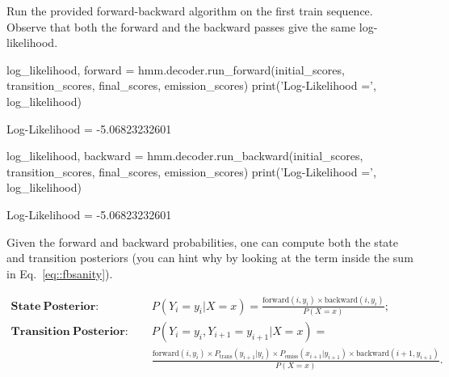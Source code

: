 \begin{exercise}
%
%

Run the provided forward-backward algorithm on the first train sequence. 
Observe that both the forward and the backward 
passes give the same log-likelihood.
\begin{python}
log_likelihood, forward = hmm.decoder.run_forward(initial_scores, transition_scores, final_scores, emission_scores)
print('Log-Likelihood =', log_likelihood)

Log-Likelihood = -5.06823232601

log_likelihood, backward = hmm.decoder.run_backward(initial_scores, transition_scores, final_scores, emission_scores)
print('Log-Likelihood =', log_likelihood)

Log-Likelihood = -5.06823232601
\end{python}
\end{exercise}


Given the forward and backward probabilities, one can compute both the state
and transition posteriors 
(you can hint why by looking at the term inside the sum in Eq.~\ref{eq::fbsanity}).


\begin{align}
 \mathbf{State \ Posterior\!:}\;\;\;\;  & P(Y_i = y_i| X=x) = \frac{\mathrm{forward}(i, y_i) \times 
 \mathrm{backward}(i, y_i)}{P(X=x)}; \label{eq::nodePosterior2} \\
 \mathbf{Transition \ Posterior\!:}\;\;\;\; &
 P(Y_i = y_i, Y_{i+1} = y_{i+1} | X=x)= \nonumber\\
 &
   \frac{\mathrm{forward}(i, y_i) \times 
   P_{\mathrm{trans}}(y_{i+1}|y_i) \times
   P_{\mathrm{emiss}}(x_{i+1}|y_{i+1}) \times
 \mathrm{backward}(i+1, y_{i+1})}{P(X=x)}.\label{eq::edgePosterior2}
\end{align}

